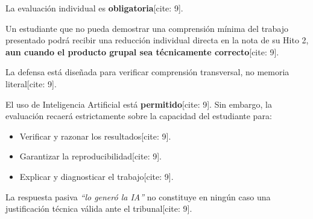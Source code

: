 \documentclass[11pt, a4paper, landscape]{article}
\begin{document}
\vspace{0.5cm}
\noindent
\begin{minipage}[t]{0.48\textwidth}
    \begin{tcolorbox}[colback=red!5, colframe=red!70!black, title=\textbf{Regla Individual Mínima}, left=1mm, right=1mm, top=1mm, bottom=1mm]
        \small
        La evaluación individual es \textbf{obligatoria}[cite: 9]. 

        Un estudiante que no pueda demostrar una comprensión mínima del trabajo presentado podrá recibir una reducción individual directa en la nota de su Hito 2, \textbf{aun cuando el producto grupal sea técnicamente correcto}[cite: 9]. 

        La defensa está diseñada para verificar comprensión transversal, no memoria literal[cite: 9].
    \end{tcolorbox}
\end{minipage}%
\hfill
\begin{minipage}[t]{0.48\textwidth}
    \begin{tcolorbox}[colback=yellow!10, colframe=orange, title=\textbf{Políticas de Uso de IA}, left=1mm, right=1mm, top=1mm, bottom=1mm]
        \small
        El uso de Inteligencia Artificial está \textbf{permitido}[cite: 9]. Sin embargo, la evaluación recaerá estrictamente sobre la capacidad del estudiante para:
        \begin{itemize}
            \item Verificar y razonar los resultados[cite: 9].
            \item Garantizar la reproducibilidad[cite: 9].
            \item Explicar y diagnosticar el trabajo[cite: 9].
        \end{itemize}
        La respuesta pasiva \textit{“lo generó la IA”} no constituye en ningún caso una justificación técnica válida ante el tribunal[cite: 9].
    \end{tcolorbox}
\end{minipage}
\end{document}

